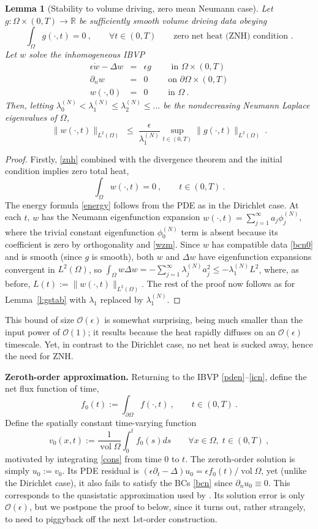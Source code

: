 \documentclass[10pt]{article}
\newcommand{\be}{\begin{equation}}
\newcommand{\ee}{\end{equation}}
\newcommand{\bea}{\begin{eqnarray}}
\newcommand{\eea}{\end{eqnarray}}
\newcommand{\R}{\mathbb{R}}
\newcommand{\bigO}{{\mathcal O}}
\DeclareMathOperator{\vol}{vol}
\newtheorem{lem}[thm]{Lemma}
\newcommand{\pO}{{\partial\Omega}}
\newcommand{\eps}{\epsilon}
\newcommand{\dn}{\partial_n}
\newcommand{\dt}{\partial_t}
\newcommand{\LTO}{{L^2(\Omega)}}
\begin{document}
\begin{lem}[Stability to volume driving, zero mean Neumann case]
  Let $g: \Omega\times(0,T) \to\R$ be sufficiently smooth
  volume driving data obeying
  \be
  \int_\Omega g(\cdot,t)=0~, \qquad \forall t\in(0,T)
  \qquad\mbox{zero net heat (ZNH) condition~.}
  \label{znh}
  \ee
  Let $w$ solve the inhomogeneous IBVP
  \bea
  \eps\dot{w} - \Delta w &=& \eps g    \qquad \mbox{ in } \Omega\times (0,T)
  \\
  \dn w  &=& 0  \qquad \mbox{ on } \pO \times (0,T)
  \label{bcn0}
  \\
  w(\cdot, 0)    &=&  0 \qquad \mbox{ in } \Omega~.
  \eea
  Then, letting $\lambda_0^{(N)}<
  \lambda_1^{(N)} \le \lambda_2^{(N)} \le \dots$
  be the nondecreasing Neumann Laplace eigenvalues of $\Omega$,
  \be
  \|w(\cdot,t)\|_\LTO \;\le\;
  \frac{\eps}{\lambda_1^{(N)}} \sup_{t\in(0,T)} \|g(\cdot,t)\|_\LTO
  ~.
  \label{gstabn}
  \ee
  \label{l:gstabn}
\end{lem}
\begin{proof}
  Firstly, \eqref{znh} combined with the divergence theorem
  and the initial condition implies zero total heat,
  \be
  \int_\Omega w(\cdot,t) = 0 ~, \qquad t \in (0,T)~.
  \label{wzm}
  \ee
  The energy formula \eqref{energy} follows from the PDE
  as in the Dirichlet case.
  At each $t$, $w$ has the Neumann eigenfunction expansion
  $w(\cdot,t) = \sum_{j=1}^\infty a_j \phi_j^{(N)}$, where the
  trivial constant eigenfunction $\phi_0^{(N)}$ term
  is absent because its coefficient is zero by orthogonality and \eqref{wzm}.
  Since $w$ has compatible data \eqref{bcn0} and is smooth
  (since $g$ is smooth),
  both $w$ and $\Delta w$ have eigenfunction expansions convergent
  in $\LTO$, so
  $\int_\Omega w \Delta w = -\sum_{j=1}^\infty \lambda_j^{(N)} a_j^2 \le
  -\lambda_1^{(N)} L^2$,
  where, as before, $L(t) := \|w(\cdot,t)\|_\LTO$.
  The rest of the proof now follows as for Lemma~\ref{l:gstab}
  with $\lambda_1$ replaced by $\lambda_1^{(N)}$.
  \end{proof}

This bound of size $\bigO(\eps)$ is somewhat surprising, being 
much smaller than the input power of $\bigO(1)$;
it results because the heat rapidly diffuses
on an $\bigO(\eps)$ timescale.
Yet, in contrast to the Dirichlet case, no net heat is sucked away, hence
the need for ZNH.

{\bf Zeroth-order approximation.}
Returning to the IBVP \eqref{pden}--\eqref{icn},
define the net flux function of time,
\be
f_0(t) := \int_\pO f(\cdot,t)~, \qquad t\in(0,T)~.
\label{f0}
\ee
Define the spatially constant time-varying function
\be
v_0(x,t) := \frac{1}{\vol\Omega} \int_0^t f_0(s) ds
\qquad \forall x \in \Omega, \; t\in(0,T)~,
\ee
motivated by integrating \eqref{cons} from time 0 to $t$.
The zeroth-order solution is simply $u_0:=v_0$.
Its PDE residual is $(\eps \dt -\Delta)u_0 = \eps f_0(t) / \vol \Omega$,
yet (unlike the Dirichlet case), it also fails to satisfy the BCs \eqref{bcn} since $\dn u_0 \equiv 0$.
This corresponds to the quasistatic approximation used by \cite{diegmiller18}.
Its solution error is only $\bigO(\eps)$, but we postpone the proof to below,
since it turns out, rather strangely, to need to piggyback off the next 1st-order construction.
\end{document}
